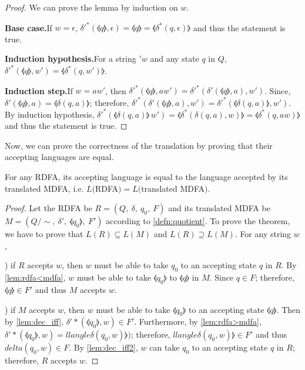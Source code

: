 \begin{proof}
\noindent We can prove the lemma by induction on \(w\). 

\par \noindent \textbf{Base case.}\quad If \(w = \epsilon\),
\(\delta'^*(\llangle q \rrangle,\epsilon) = \llangle q \rrangle =
\llangle \delta^*(q,\epsilon) \rrangle\) and thus the statement is
true. 

\par \noindent \textbf{Induction hypothesis.}\quad For a string \('w\) and
any state \(q\) in \(Q\), \(\delta'^*(\llangle q \rrangle,w') = \llangle \delta^*(q,w') \rrangle\). 

\par \noindent \textbf{Induction step.}\quad If \(w = aw'\), then
\(\delta'^*(\llangle q \rrangle,aw') = \delta'^*(\delta'(\llangle q
\rrangle,a),w')\). Since, \(\delta'(\llangle q \rrangle,a) = \llangle
\delta(q,a) \rrangle\); therefore, \(\delta'^*(\delta'(\llangle q
\rrangle,a),w') = \delta'^*(\llangle
\delta(q,a) \rrangle,w')\). By induction hypothesis,
\(\delta'^*(\llangle \delta(q,a) \rrangle\,w') = \llangle
\delta^*(\delta(q,a),w) \rrangle = \llangle
\delta^*(q,aw) \rrangle\) and thus the statement is true. 
\end{proof}

\par Now, we can prove the correctness of the translation by proving
that their accepting languages are equal. 

\begin{thm}
\noindent For any RDFA, its accepting language is equal to
the language accepted by its translated MDFA, i.e. \(L(\)RDFA\()
= L(\)translated MDFA\()\). 
\end{thm}

\begin{proof}
\noindent Let the RDFA be \(R = (Q,\ \delta,\ q_0,\ F)\) and its
translated MDFA be \(M = (Q/\!\sim,\ \delta',\ \llangle q_0 \rrangle,\
F')\) according to \autoref{defn:quotient}. To prove the theorem, we
have to prove that \(L(R) \subseteq L(M)\) and \(L(R) \supseteq
L(M)\). For any string \(w\),

\par {}) if \(R\) accepts \(w\), then \(w\) must be able to
take \(q_0\) to an accepting state \(q\) in \(R\). By \autoref{lem:rdfa<mdfa},
\(w\) must be able to take \(\llangle q_0 \rrangle\) to \(\llangle q
\rrangle\) in \(M\). Since \(q \in F\); therefore, \(\llangle q
\rrangle \in F'\) and thus \(M\) accepts \(w\). 

\par {}) if \(M\) accepts \(w\), then \(w\) must be able to
take \(\llangle q_0 \rrangle\) to an accepting state \(\llangle q
\rrangle\). Then by \autoref{lem:dec_iff}, \(\delta'*(\llangle q_0
\rrangle,w) \in F'\). Furthermore, by \autoref{lem:rdfa>mdfa},
\(\delta'*(\llangle q_0 \rrangle,w) = llangle \delta(q_0,w)
\rrangle)\); therefore, \(llangle \delta(q_0,w) \rrangle \in F'\) and
thus \(delta(q_0,w) \in F\). By \autoref{lem:dec_iff2}, \(w\) can take
\(q_0\) to an accepting state \(q\) in \(R\); therefore, \(R\) accepts
\(w\). 
\end{proof}

